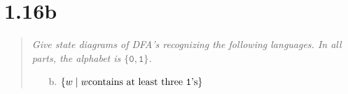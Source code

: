 \section{1.16b}

\begin{quote}\color{black!80}\slshape
  Give state diagrams of DFA's recognizing the following
  languages. In all parts, the alphabet is $\{\mathtt{0}, \mathtt{1}\}$.

  \begin{itemize}
    \item[b.] $\{ w \mid w \text{contains at least three \texttt{1}'s}\}$
  \end{itemize}
\end{quote}

